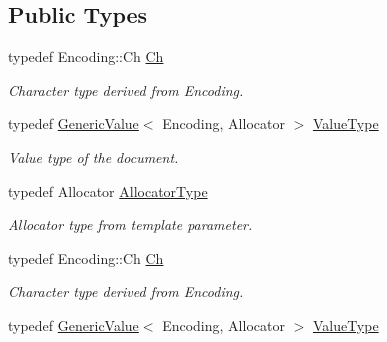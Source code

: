 \subsection*{Public Types}
\begin{DoxyCompactItemize}
\item 
typedef Encoding\+::\+Ch \hyperlink{class_generic_document_a6f5b0b7b6626508d094ae67490269700}{Ch}\hypertarget{class_generic_document_a6f5b0b7b6626508d094ae67490269700}{}\label{class_generic_document_a6f5b0b7b6626508d094ae67490269700}

\begin{DoxyCompactList}\small\item\em Character type derived from Encoding. \end{DoxyCompactList}\item 
typedef \hyperlink{class_generic_value}{Generic\+Value}$<$ Encoding, Allocator $>$ \hyperlink{class_generic_document_a8936205dc215dda029060d7e835e0549}{Value\+Type}\hypertarget{class_generic_document_a8936205dc215dda029060d7e835e0549}{}\label{class_generic_document_a8936205dc215dda029060d7e835e0549}

\begin{DoxyCompactList}\small\item\em Value type of the document. \end{DoxyCompactList}\item 
typedef Allocator \hyperlink{class_generic_document_a35155b912da66ced38d22e2551364c57}{Allocator\+Type}\hypertarget{class_generic_document_a35155b912da66ced38d22e2551364c57}{}\label{class_generic_document_a35155b912da66ced38d22e2551364c57}

\begin{DoxyCompactList}\small\item\em Allocator type from template parameter. \end{DoxyCompactList}\item 
typedef Encoding\+::\+Ch \hyperlink{class_generic_document_a6f5b0b7b6626508d094ae67490269700}{Ch}\hypertarget{class_generic_document_a6f5b0b7b6626508d094ae67490269700}{}\label{class_generic_document_a6f5b0b7b6626508d094ae67490269700}

\begin{DoxyCompactList}\small\item\em Character type derived from Encoding. \end{DoxyCompactList}\item 
typedef \hyperlink{class_generic_value}{Generic\+Value}$<$ Encoding, Allocator $>$ \hyperlink{class_generic_document_a8936205dc215dda029060d7e835e0549}{Value\+Type}\hypertarget{class_generic_document_a8936205dc215dda029060d7e835e0549}{}\label{class_generic_document_a8936205dc215dda029060d7e835e0549}


\end{DoxyCompactItemize}
